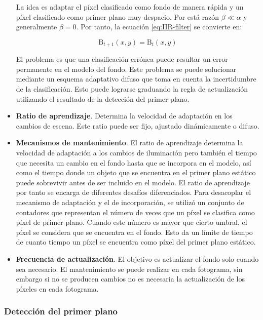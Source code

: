 \begin{itemize}
    La idea es adaptar el píxel clasificado como fondo de manera rápida y un píxel clasificado como primer plano muy despacio. Por está razón $\beta \ll \alpha$ y generalmente $\beta = 0$. Por tanto, la ecuación \ref{eq:IIR-filter} se convierte en:
    
    \begin{equation}
    \label{eq:IIR-filter2}
    \text{B}_{t+1}(x,y) = \text{B}_{t}(x,y)
    \end{equation}
    
    El problema es que una clasificación errónea puede resultar un error permanente en el modelo del fondo. Este problema se puede solucionar mediante un esquema adaptativo difuso que toma en cuenta la incertidumbre de la clasificación. Esto puede lograrse graduando la regla de actualización utilizando el resultado de la detección del primer plano.
    
    \item \textbf{Ratio de aprendizaje}. Determina la velocidad de adaptación en los cambios de escena. Este ratio puede ser fijo, ajustado dinámicamente o difuso.
    \item \textbf{Mecanismos de mantenimiento}. El ratio de aprendizaje determina la velocidad de adaptación a los cambios de iluminación pero también el tiempo que necesita un cambio en el fondo hasta que se incorpora en el modelo, así como el tiempo donde un objeto que se encuentra en el primer plano estático puede sobrevivir antes de ser incluido en el modelo. El ratio de aprendizaje por tanto se encarga de diferentes desafíos diferenciados. Para desacoplar el mecanismo de adaptación y el de incorporación, \cite{1415580} se utilizó un conjunto de contadores que representan el número de veces que un píxel se clasifica como píxel de primer plano. Cuando este número es mayor que cierto umbral, el píxel se considera que se encuentra en el fondo. Esto da un límite de tiempo de cuanto tiempo un píxel se encuentra como píxel del primer plano estático.
    \item \textbf{Frecuencia de actualización}. El objetivo es actualizar el fondo solo cuando sea necesario. El mantenimiento se puede realizar en cada fotograma, sin embargo si no se producen cambios no es necesaria la actualización de los píxeles en cada fotograma.
\end{itemize}

\subsubsection*{Detección del primer plano}
\label{subsubsec:detección-primer-plano}

